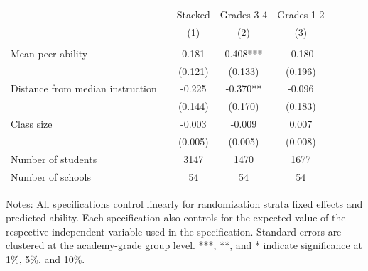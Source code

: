 \begin{center} 
\caption{\small Effect on test scores} 
\label{tab:descriptives} 
\begin{small}
\begin{threeparttable}
\begin{tabular} {@{} l l  c c c  @{}} \toprule \toprule
 & & Stacked & Grades 3-4  & Grades 1-2 \\
& &(1)&(2)&(3) \\ \midrule 
\\
Mean peer ability &  & 0.181 & 0.408*** & -0.180 \\
                 &  & (0.121) & (0.133) & (0.196) \\
Distance from median instruction &  & -0.225 & -0.370** & -0.096 \\
                 &  & (0.144) & (0.170) & (0.183) \\
Class size &  & -0.003 & -0.009 & 0.007 \\
                 &  & (0.005) & (0.005) & (0.008) \\
\midrule
Number of students &  & 3147 & 1470 & 1677 \\
Number of schools &  & 54 & 54 & 54 \\
\bottomrule
\end{tabular}
\begin{tablenotes}
\item Notes: All specifications control linearly for randomization strata fixed effects and predicted ability. Each specification also controls for the expected value of the respective independent variable used in the specification. Standard errors are clustered at the academy-grade group level. ***, **, and * indicate significance at 1\%, 5\%, and 10\%.\end{tablenotes}
\end{threeparttable}
\end{small}
\end{center}
\clearpage

